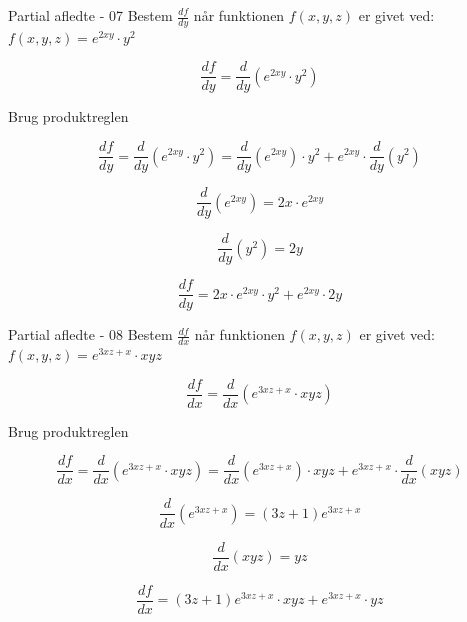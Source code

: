 \documentclass{article}
\begin{document}
\begin{exercise}{Partial afledte - 07}
Bestem $\frac{df}{dy}$ når funktionen $f(x,y,z)$ er givet ved:
$f(x,y,z) = e^{2xy} \cdot y^2$


\hint
\[
\frac{df}{dy} = \frac{d}{dy} \left(e^{2xy} \cdot y^2\right)
\]

\hint
Brug produktreglen

\hint
\[
\frac{df}{dy} = \frac{d}{dy} \left( e^{2xy} \cdot y^2\right) = \frac{d}{dy} \left( e^{2xy} \right) \cdot y^2 + e^{2xy} \cdot \frac{d}{dy}\left( y^2\right)
\]

\hint
\[
\frac{d}{dy} \left(e^{2xy} \right) = 2x \cdot e^{2xy}
\]

\hint
\[
\frac{d}{dy}\left( y^2\right) = 2y
\]

\hint
\[
\frac{df}{dy} = 2x \cdot e^{2xy} \cdot y^2 + e^{2xy} \cdot 2y
\]


\end{exercise}

\begin{exercise}{Partial afledte - 08}
Bestem $\frac{df}{dx}$ når funktionen $f(x,y,z)$ er givet ved:
$f(x,y,z) = e^{3xz + x} \cdot xyz$


\hint
\[
\frac{df}{dx} = \frac{d}{dx} \left( e^{3xz + x} \cdot xyz\right)
\]

\hint
Brug produktreglen

\hint
\[
\frac{df}{dx} = \frac{d}{dx} \left( e^{3xz + x} \cdot xyz\right) = \frac{d}{dx} \left(e^{3xz + x} \right) \cdot xyz + e^{3xz + x} \cdot \frac{d}{dx}\left( xyz\right)
\]

\hint
\[
\frac{d}{dx} \left( e^{3xz + x}\right) = (3z + 1) e^{3xz + x}
\]

\hint
\[
\frac{d}{dx}\left( xyz\right) = yz
\]

\hint
\[
\frac{df}{dx} = (3z + 1) e^{3xz + x} \cdot xyz + e^{3xz + x} \cdot yz
\]


\end{exercise}
\end{document}
